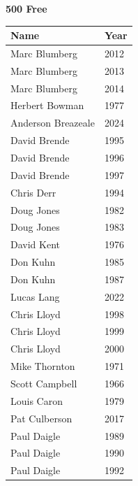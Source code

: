\hfill
\begin{minipage}[t]{0.48\textwidth}
\centering
\textbf{\textcolor{teamprimary}{500 Free}}\par
\vspace{0.5em}
\centering
\small
\renewcommand{\arraystretch}{1.0}
\setlength{\tabcolsep}{4pt}
\begin{tabular}{@{}p{3.0cm}p{1.0cm}@{}}
\toprule
\textbf{Name} & \textbf{Year} \\
\midrule
Marc Blumberg & 2012 \\
Marc Blumberg & 2013 \\
Marc Blumberg & 2014 \\
Herbert Bowman & 1977 \\
Anderson Breazeale & 2024 \\
David Brende & 1995 \\
David Brende & 1996 \\
David Brende & 1997 \\
Chris Derr & 1994 \\
Doug Jones & 1982 \\
Doug Jones & 1983 \\
David Kent & 1976 \\
Don Kuhn & 1985 \\
Don Kuhn & 1987 \\
Lucas Lang & 2022 \\
Chris Lloyd & 1998 \\
Chris Lloyd & 1999 \\
Chris Lloyd & 2000 \\
Mike Thornton & 1971 \\
Scott Campbell & 1966 \\
Louis Caron & 1979 \\
Pat Culberson & 2017 \\
Paul Daigle & 1989 \\
Paul Daigle & 1990 \\
Paul Daigle & 1992 \\
\bottomrule
\end{tabular}
\end{minipage}
\vspace{1.2em}
